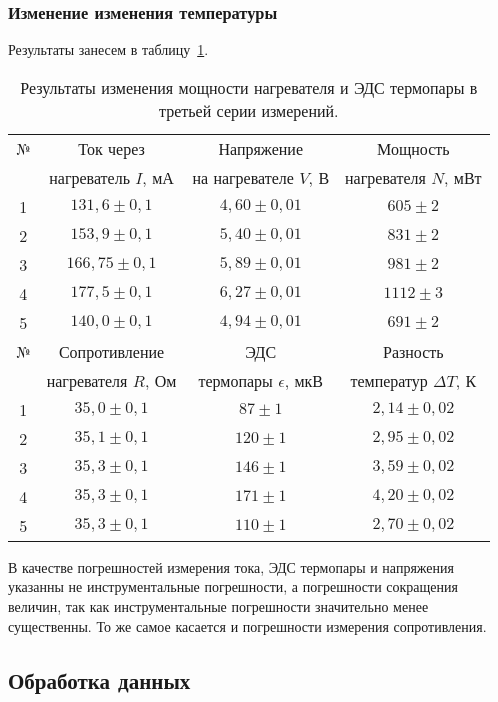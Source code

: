\documentclass[a4paper,11pt]{article}
\begin{document}
\subsubsection{Изменение изменения температуры}
Результаты занесем в таблицу~\ref{table:tab6}.
\begin{table}[h!]
\centering
\begin{tabular}{ ||c|c|c|c|| }
  \hline
  № & Ток через & Напряжение & Мощность \\
   & нагреватель $I$, $мА$ & на нагревателе $V$, $В$ & нагревателя $N$, $мВт$ \\
  \hline
  1 & $131,6 \pm 0,1$ & $4,60 \pm 0,01$ & $605 \pm 2$ \\
  2 & $153,9 \pm 0,1$ & $5,40 \pm 0,01$ & $831 \pm 2$ \\
  3 & $166,75 \pm 0,1$ & $5,89 \pm 0,01$ & $981 \pm 2$ \\
  4 & $177,5 \pm 0,1$ & $6,27 \pm 0,01$ & $1112 \pm 3$ \\
  5 & $140,0 \pm 0,1$ & $4,94 \pm 0,01$ & $691 \pm 2$ \\
  \hline\hline
  № & Сопротивление & ЭДС & Разность \\
   & нагревателя $R$, $Ом$ & термопары $\epsilon$, $мкВ$ & температур $\Delta T$, $К$ \\
  \hline
  1 & $35,0 \pm 0,1$ & $87 \pm 1$ & $2,14 \pm 0,02$ \\
  2 & $35,1 \pm 0,1$ & $120 \pm 1$ & $2,95 \pm 0,02$ \\
  3 & $35,3 \pm 0,1$ & $146 \pm 1$ & $3,59 \pm 0,02$ \\
  4 & $35,3 \pm 0,1$ & $171 \pm 1$ & $4,20 \pm 0,02$ \\
  5 & $35,3 \pm 0,1$ & $110 \pm 1$ & $2,70 \pm 0,02$ \\
  \hline
\end{tabular}
\caption{Результаты изменения мощности нагревателя и ЭДС термопары в третьей серии измерений.}
\label{table:tab6}
\end{table}\newline
\newline
В качестве погрешностей измерения тока, ЭДС термопары и напряжения указанны не инструментальные погрешности, а погрешности сокращения величин, так как инструментальные погрешности значительно менее существенны. То же самое касается и погрешности измерения сопротивления.
\subsection{Обработка данных}
\end{document}
